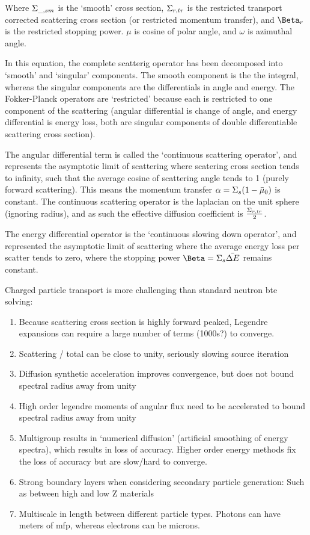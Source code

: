 Where $\Sigma_{\text{\textunderscore},sm}$ is the `smooth' cross section, $\Sigma_{r,tr}$ is the restricted transport corrected scattering cross section (or restricted momentum transfer), and $\Beta_r$ is the restricted stopping power. $\mu$ is cosine of polar angle, and $\omega$ is azimuthal angle. 

In this equation, the complete scatterig operator has been decomposed into `smooth' and `singular' components. The smooth component is the the integral, whereas the singular components are the differentials in angle and energy. The Fokker-Planck operators are `restricted' because each is restricted to one component of the scattering (angular differential is change of angle, and energy differential is energy loss, both are singular components of double differentiable scattering cross section). 

The angular differential term is called the `continuous scattering operator', and represents the asymptotic limit of scattering where scatering cross section tends to infinity, such that the average cosine of scattering angle tends to 1 (purely forward scattering). This means the momentum transfer $\alpha=\Sigma_{s}(1-\bar{\mu}_0)$ is constant. The continuous scattering operator is the laplacian on the unit sphere (ignoring radius), and as such the effective diffusion coefficient is $\frac{\Sigma_{r,tr}}{2}$.

The energy differential operator is the `continuous slowing down operator', and represented the asymptotic limit of scattering where the average energy loss per scatter tends to zero, where the stopping power $\Beta=\macroxs{s}\bar{\Delta\energy}$ remains constant. 

Charged particle transport is more challenging than standard neutron \gls{bte} solving:
\begin{enumerate}
    \item Because scattering cross section is highly forward peaked, Legendre expansions can require a large number of terms (1000s?) to converge.
    \item Scattering / total can be close to unity, seriously slowing source iteration
    \item Diffusion synthetic acceleration improves convergence, but does not bound spectral radius away from unity
    \item High order legendre moments of angular flux need to be accelerated to bound spectral radius away from unity
    \item Multigroup results in `numerical diffusion' (artificial smoothing of energy spectra), which results in loss of accuracy. Higher order energy methods fix the loss of accuracy but are slow/hard to converge. 
    \item Strong boundary layers when considering secondary particle generation: Such as between high and low Z materials
    \item Multiscale in length between different particle types. Photons can have meters of mfp, whereas electrons can be microns. 
\end{enumerate}

